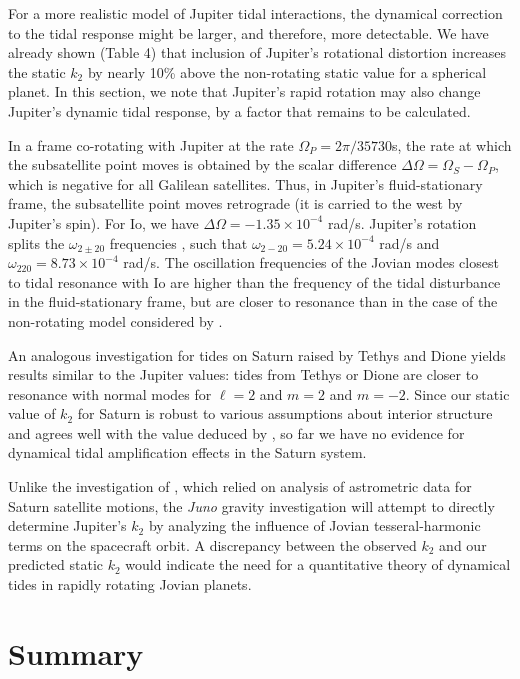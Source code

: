 For a more realistic model of Jupiter tidal interactions, the dynamical correction to
the tidal response might be larger, and therefore, more detectable.  We have already
shown (Table 4) that inclusion of Jupiter's rotational distortion increases the
static $k_2$ by nearly 10\% above the non-rotating static value for a spherical
planet.  In this section, we note that
Jupiter's rapid rotation may also change Jupiter's dynamic tidal response,
by a factor that remains to be calculated.

In a frame co-rotating with Jupiter at the rate $\Omega_P=2 \pi / 35730$s,
the rate at which the subsatellite point moves is obtained by the scalar difference
$\Delta \Omega = \Omega_S - \Omega_P$, which is negative for all Galilean satellites.  Thus,
in Jupiter's fluid-stationary frame, the subsatellite point moves retrograde
(it is carried to the west by Jupiter's spin).  
For Io, we have $\Delta \Omega = -1.35 \times 10^{-4}$ rad/s.
Jupiter's rotation splits the
$\omega_{2\pm20}$ frequencies \citep{vorontsov1981}, such that
$\omega_{2-20}= 5.24 \times 10^{-4}$ rad/s and
$\omega_{220}= 8.73 \times 10^{-4}$ rad/s.  The oscillation
frequencies of the Jovian modes closest to tidal resonance with Io are
higher than the frequency of the tidal disturbance in
the fluid-stationary frame, but are closer to resonance than
in the case of the non-rotating model considered by
\citet{vorontsov1984}.

An analogous investigation for tides on Saturn raised by
Tethys and Dione yields results similar to the Jupiter values:
tides from Tethys or Dione are closer to resonance with normal modes for $\ell=2$ and
$m=2$ and $m=-2$.  Since our static
value of $k_2$ for Saturn \citep{wahl2016} is robust to various assumptions about interior
structure and agrees well
with the value deduced by \citet{lainey2016}, so far we have no evidence for dynamical
tidal amplification effects in the Saturn system.  

Unlike the investigation of \citet{lainey2016}, which relied on analysis of astrometric data for
Saturn satellite motions, the \textit{Juno} gravity investigation will attempt to directly determine
Jupiter's $k_2$ by analyzing the influence of Jovian tesseral-harmonic terms on the spacecraft orbit.
A discrepancy
between the observed $k_2$ and our predicted static $k_2$
would indicate the need for
a quantitative theory of dynamical tides in rapidly rotating Jovian planets. 


\section{Summary} \label{summary}

